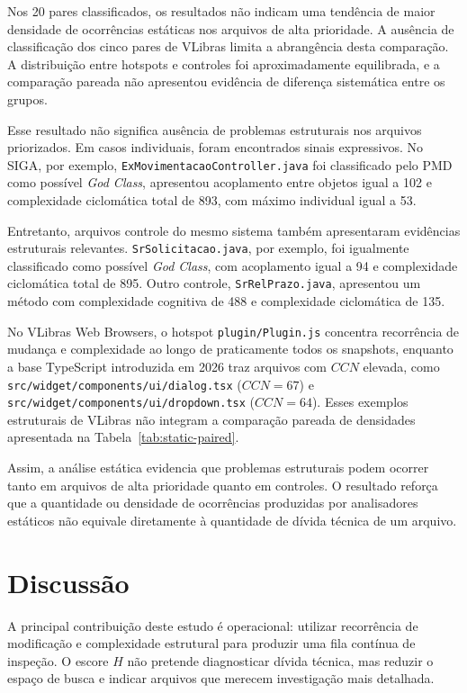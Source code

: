 \documentclass[12pt]{article}
\newcommand{\CCN}{\ensuremath{CCN}}
\begin{document}
Nos 20 pares classificados, os resultados não indicam uma tendência de maior densidade de ocorrências estáticas nos arquivos de alta prioridade. A ausência de classificação dos cinco pares de VLibras limita a abrangência desta comparação. A distribuição entre hotspots e controles foi aproximadamente equilibrada, e a comparação pareada não apresentou evidência de diferença sistemática entre os grupos.

Esse resultado não significa ausência de problemas estruturais nos arquivos priorizados. Em casos individuais, foram encontrados sinais expressivos. No SIGA, por exemplo, \texttt{ExMovimentacaoController.java} foi classificado pelo PMD como possível \emph{God Class}, apresentou acoplamento entre objetos igual a 102 e complexidade ciclomática total de 893, com máximo individual igual a 53.

Entretanto, arquivos controle do mesmo sistema também apresentaram evidências estruturais relevantes. \texttt{SrSolicitacao.java}, por exemplo, foi igualmente classificado como possível \emph{God Class}, com acoplamento igual a 94 e complexidade ciclomática total de 895. Outro controle, \texttt{SrRelPrazo.java}, apresentou um método com complexidade cognitiva de 488 e complexidade ciclomática de 135.

No VLibras Web Browsers, o hotspot \texttt{plugin/Plugin.js} concentra recorrência de mudança e complexidade ao longo de praticamente todos os snapshots, enquanto a base TypeScript introduzida em 2026 traz arquivos com \CCN{} elevada, como \texttt{src/widget/components/ui/dialog.tsx} ($\CCN=67$) e \texttt{src/widget/components/ui/dropdown.tsx} ($\CCN=64$). Esses exemplos estruturais de VLibras não integram a comparação pareada de densidades apresentada na Tabela~\ref{tab:static-paired}.

Assim, a análise estática evidencia que problemas estruturais podem ocorrer tanto em arquivos de alta prioridade quanto em controles. O resultado reforça que a quantidade ou densidade de ocorrências produzidas por analisadores estáticos não equivale diretamente à quantidade de dívida técnica de um arquivo.

\section{Discussão}
A principal contribuição deste estudo é operacional: utilizar recorrência de modificação e complexidade estrutural para produzir uma fila contínua de inspeção. O escore $H$ não pretende diagnosticar dívida técnica, mas reduzir o espaço de busca e indicar arquivos que merecem investigação mais detalhada.
\end{document}
